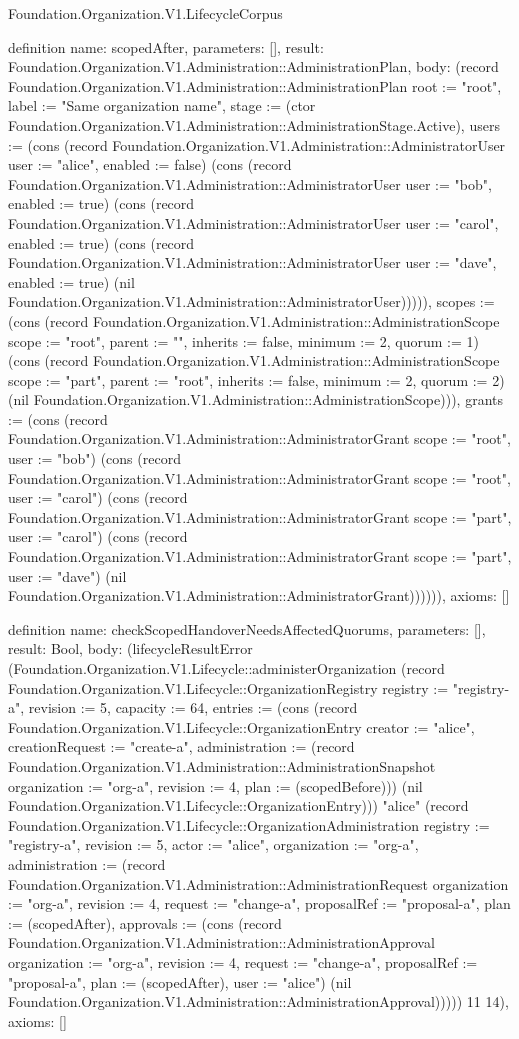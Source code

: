 \begin{lexlean}{Foundation.Organization.V1.LifecycleCorpus}
\begin{semanticmodule}
definition{
  name: scopedAfter,
  parameters: [],
  result: Foundation.Organization.V1.Administration::AdministrationPlan,
  body: (record Foundation.Organization.V1.Administration::AdministrationPlan {root := "root", label := "Same organization name", stage := (ctor Foundation.Organization.V1.Administration::AdministrationStage.Active), users := (cons (record Foundation.Organization.V1.Administration::AdministratorUser {user := "alice", enabled := false}) (cons (record Foundation.Organization.V1.Administration::AdministratorUser {user := "bob", enabled := true}) (cons (record Foundation.Organization.V1.Administration::AdministratorUser {user := "carol", enabled := true}) (cons (record Foundation.Organization.V1.Administration::AdministratorUser {user := "dave", enabled := true}) (nil Foundation.Organization.V1.Administration::AdministratorUser))))), scopes := (cons (record Foundation.Organization.V1.Administration::AdministrationScope {scope := "root", parent := "", inherits := false, minimum := 2, quorum := 1}) (cons (record Foundation.Organization.V1.Administration::AdministrationScope {scope := "part", parent := "root", inherits := false, minimum := 2, quorum := 2}) (nil Foundation.Organization.V1.Administration::AdministrationScope))), grants := (cons (record Foundation.Organization.V1.Administration::AdministratorGrant {scope := "root", user := "bob"}) (cons (record Foundation.Organization.V1.Administration::AdministratorGrant {scope := "root", user := "carol"}) (cons (record Foundation.Organization.V1.Administration::AdministratorGrant {scope := "part", user := "carol"}) (cons (record Foundation.Organization.V1.Administration::AdministratorGrant {scope := "part", user := "dave"}) (nil Foundation.Organization.V1.Administration::AdministratorGrant)))))}),
  axioms: []
}

definition{
  name: checkScopedHandoverNeedsAffectedQuorums,
  parameters: [],
  result: Bool,
  body: (lifecycleResultError (Foundation.Organization.V1.Lifecycle::administerOrganization (record Foundation.Organization.V1.Lifecycle::OrganizationRegistry {registry := "registry-a", revision := 5, capacity := 64, entries := (cons (record Foundation.Organization.V1.Lifecycle::OrganizationEntry {creator := "alice", creationRequest := "create-a", administration := (record Foundation.Organization.V1.Administration::AdministrationSnapshot {organization := "org-a", revision := 4, plan := (scopedBefore)})}) (nil Foundation.Organization.V1.Lifecycle::OrganizationEntry))}) "alice" (record Foundation.Organization.V1.Lifecycle::OrganizationAdministration {registry := "registry-a", revision := 5, actor := "alice", organization := "org-a", administration := (record Foundation.Organization.V1.Administration::AdministrationRequest {organization := "org-a", revision := 4, request := "change-a", proposalRef := "proposal-a", plan := (scopedAfter), approvals := (cons (record Foundation.Organization.V1.Administration::AdministrationApproval {organization := "org-a", revision := 4, request := "change-a", proposalRef := "proposal-a", plan := (scopedAfter), user := "alice"}) (nil Foundation.Organization.V1.Administration::AdministrationApproval))})})) 11 14),
  axioms: []
}


\end{semanticmodule}
\end{lexlean}
